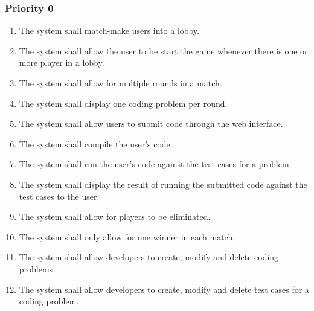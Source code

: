 \documentclass[12pt, titlepage]{article}
\begin{document}
\subsubsection{Priority 0}
\begin{enumerate}[label=FR.\arabic*]
    \item The system shall match-make users into a lobby. \label{FR.1}
    \item The system shall allow the user to be start the game whenever there is one or more player in a lobby. \label{FR.2}
    \item The system shall allow for multiple rounds in a match. \label{FR.3}
    \item The system shall display one coding problem per round. \label{FR.4}
    \item The system shall allow users to submit code through the web interface. \label{FR.5}
    \item The system shall compile the user's code. \label{FR.6}
    \item The system shall run the user's code against the test cases for a problem.  \label{FR.7}
    \item The system shall display the result of running the submitted code against the test cases to the user.  \label{FR.8}
    \item The system shall allow for players to be eliminated.  \label{FR.9}
    \item The system shall only allow for one winner in each match. \label{FR.10}
    \item The system shall allow developers to create, modify and delete coding problems.  \label{FR.11}
    \item The system shall allow developers to create, modify and delete test cases for a coding problem. \label{FR.12}

\end{enumerate}
\end{document}
